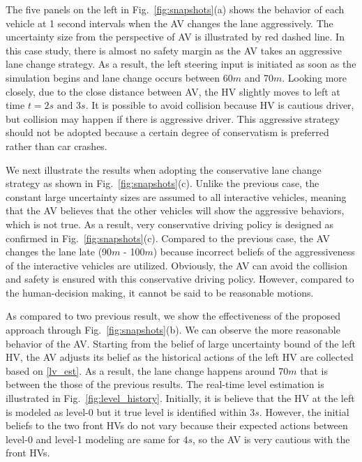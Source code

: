 \documentclass[10pt,journal]{IEEEtran}
\begin{document}
	The five panels on the left in Fig.~\ref{fig:snapshots}(a) shows the behavior of each vehicle at 1 second intervals when the AV changes the lane aggressively. The uncertainty size from the perspective of AV is illustrated by red dashed line. In this case study, there is almost no safety margin as the AV takes an aggressive lane change strategy. As a result, the left steering input is initiated as soon as the simulation begins and lane change occurs between 60$m$ and 70$m$. Looking more closely, due to the close distance between AV, the HV slightly moves to left at time $t=2s \text{ and } 3s$. It is possible to avoid collision because HV is cautious driver, but collision may happen if there is aggressive driver. This aggressive strategy should not be adopted because a certain degree of conservatism is preferred rather than car crashes.
	
	We next illustrate the results when adopting the conservative lane change strategy as shown in Fig.~\ref{fig:snapshots}(c). Unlike the previous case, the constant large uncertainty sizes are assumed to all interactive vehicles, meaning that the AV believes that the other vehicles will show the aggressive behaviors, which is not true. As a result, very conservative driving policy is designed as confirmed in Fig.~\ref{fig:snapshots}(c). Compared to the previous case, the AV changes the lane late (90$m$ - 100$m$) because incorrect beliefs of the aggressiveness of the interactive vehicles are utilized. Obviously, the AV can avoid the collision and safety is ensured with this conservative driving policy. However, compared to the human-decision making, it cannot be said to be reasonable motions.
	
	As compared to two previous result, we show the effectiveness of the proposed approach through Fig.~\ref{fig:snapshots}(b). We can observe the more reasonable behavior of the AV. Starting from the belief of large uncertainty bound of the left HV, the AV adjusts its belief as the historical actions of the left HV are collected based on \eqref{lv_est}. As a result, the lane change happens around 70$m$ that is between the those of the previous results. The real-time level estimation is illustrated in Fig.~\ref{fig:level_history}. Initially, it is believe that the HV at the left is modeled as level-0 but it true level is identified within 3$s$. However, the initial beliefs to the two front HVs do not vary because their expected actions between level-0 and level-1 modeling are same for $4s$, so the AV is very cautious with the front HVs.
	
\end{document}
